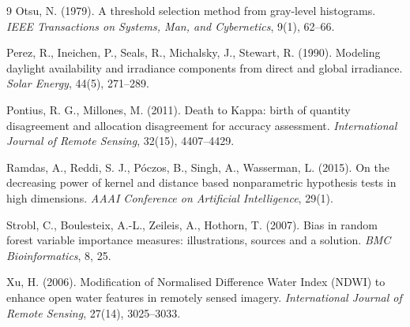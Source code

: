 \documentclass[11pt,a4paper,oneside]{book}
\begin{document}
\begin{thebibliography}{9}
Otsu, N. (1979). A threshold selection method from gray-level histograms.
\emph{IEEE Transactions on Systems, Man, and Cybernetics}, 9(1), 62--66.

Perez, R., Ineichen, P., Seals, R., Michalsky, J., Stewart, R. (1990). Modeling
daylight availability and irradiance components from direct and global
irradiance. \emph{Solar Energy}, 44(5), 271--289.

Pontius, R. G., Millones, M. (2011). Death to Kappa: birth of quantity
disagreement and allocation disagreement for accuracy assessment.
\emph{International Journal of Remote Sensing}, 32(15), 4407--4429.

Ramdas, A., Reddi, S. J., Póczos, B., Singh, A., Wasserman, L. (2015). On the
decreasing power of kernel and distance based nonparametric hypothesis tests in
high dimensions. \emph{AAAI Conference on Artificial Intelligence}, 29(1).

Strobl, C., Boulesteix, A.-L., Zeileis, A., Hothorn, T. (2007). Bias in random
forest variable importance measures: illustrations, sources and a solution.
\emph{BMC Bioinformatics}, 8, 25.

Xu, H. (2006). Modification of Normalised Difference Water Index (NDWI) to
enhance open water features in remotely sensed imagery. \emph{International
Journal of Remote Sensing}, 27(14), 3025--3033.

\end{thebibliography}

\appendix



\end{document}
